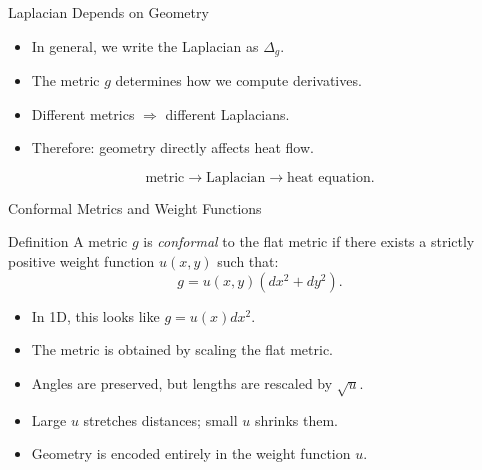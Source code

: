 \documentclass[aspectratio=1610,10pt]{beamer}
\begin{document}
  \begin{frame}{Laplacian Depends on Geometry}
    \begin{itemize}
      \item In general, we write the Laplacian as $\Delta_g$.
      \item The metric $g$ determines how we compute derivatives.
      \item Different metrics $\Rightarrow$ different Laplacians.
      \item Therefore: geometry directly affects heat flow.
    \end{itemize}

    \[%
      \text{metric} \rightarrow \text{Laplacian} \rightarrow \text{heat equation}
    .\]%
  \end{frame}

  \begin{frame}{Conformal Metrics and Weight Functions}
    \begin{block}{Definition}
      A metric $g$ is \emph{conformal} to the flat metric if there exists a strictly positive weight function $u(x,y)$ such that:
      \[%
        g = u(x,y)(dx^2 + dy^2)
      .\]%
    \end{block}

    \begin{itemize}
      \item In 1D, this looks like $g = u(x)dx^2$.
      \item The metric is obtained by scaling the flat metric.
      \item Angles are preserved, but lengths are rescaled by $\sqrt{u}$.
      \item Large $u$ stretches distances; small $u$ shrinks them.
      \item Geometry is encoded entirely in the weight function $u$.
    \end{itemize}
  \end{frame}
\end{document}
